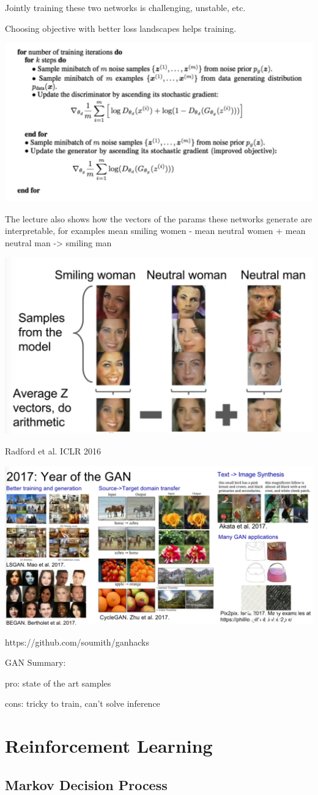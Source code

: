 Jointly training these two networks is challenging, unstable, etc.

Choosing objective with better loss landscapes helps training.

\includegraphics[width=0.5\columnwidth]{fei_fei_li/lecture_13/full_opt_pipeline.png}

The lecture also shows how the vectors of the params these networks generate are interpretable, for examples mean smiling women - mean neutral women + mean neutral man -> smiling man

\includegraphics[width=0.5\columnwidth]{fei_fei_li/lecture_13/interpetable.png}

Radford et al. ICLR 2016

\includegraphics[width=0.5\columnwidth]{fei_fei_li/lecture_13/year_of_gan.png}



https://github.com/soumith/ganhacks

GAN Summary:

pro: state of the art samples

cons: tricky to train, can't solve inference

\section{Reinforcement Learning }

\subsection{Markov Decision Process}

